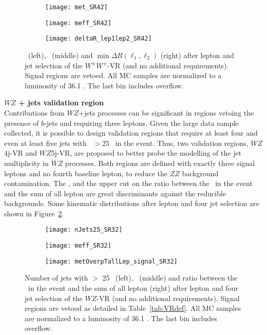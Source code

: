 \begin{figure}[t!]
\centering
\begin{subfigure}[t]{0.32\textwidth}
\texttt{[image: met\_SR42]}
\end{subfigure}
\begin{subfigure}[t]{0.32\textwidth}
\texttt{[image: meff\_SR42]}
\end{subfigure}
\begin{subfigure}[t]{0.32\textwidth}
\texttt{[image: deltaR\_lep1lep2\_SR42]}
\end{subfigure}
\caption{\met\ (left), \meff\ (middle) and $\operatorname{min}\Delta R (\ell_{1}, \ell_2)$ (right) after lepton and jet selection of the $W^\pm W^\pm$-VR (and no additional requirements). Signal regions are vetoed. All MC samples are normalized to a luminosity of 36.1 \ifb. The last bin includes overflow.
}
\label{fig:WW_VR_afterLepJetSel}
\end{figure} 


\par{\bf $WZ$ + jets validation region\\}
Contributions from $WZ$+jets processes can be significant in regions vetoing the presence of $b$-jets and requiring three leptons. 
Given the large data sample collected, it is possible to design validation 
regions that require at least four and even at least five jets with \pt~$>$25 \GeV~in the event. Thus, two validation regions, $WZ$4j-VR and $WZ$5j-VR, are proposed to better probe the modelling of the jet multiplicity in $WZ$ processes. Both regions are defined with exactly three signal leptons and no fourth baseline lepton, to reduce the $ZZ$ background contamination. The \meff, and the upper cut on the ratio between the \met\ in the event and the sum of all lepton \pt are great discriminants against the reducible backgrounds. Some kinematic distributions after lepton and four jet selection are shown in Figure~\ref{fig:WZ_VR_afterLepJetSel}.

\begin{figure}[t!]
\centering
\begin{subfigure}[t]{0.32\textwidth}
\texttt{[image: nJets25\_SR32]}
\end{subfigure}
\begin{subfigure}[t]{0.32\textwidth}
\texttt{[image: meff\_SR32]}
\end{subfigure}
\begin{subfigure}[t]{0.32\textwidth}
\texttt{[image: metOverpTallLep\_signal\_SR32]}
\end{subfigure}
\caption{Number of jets with \pt $>$ 25 \GeV~(left), \meff\ (middle) and ratio between the \met\ in the event and the sum of all lepton \pt (right) after lepton and four jet selection of the $WZ$-VR (and no additional requirements). Signal regions are vetoed as detailed in Table~\ref{tab:VRdef}. All MC samples are normalized to a luminosity of 36.1 \ifb. The last bin includes overflow.
}
\label{fig:WZ_VR_afterLepJetSel}
\end{figure} 

